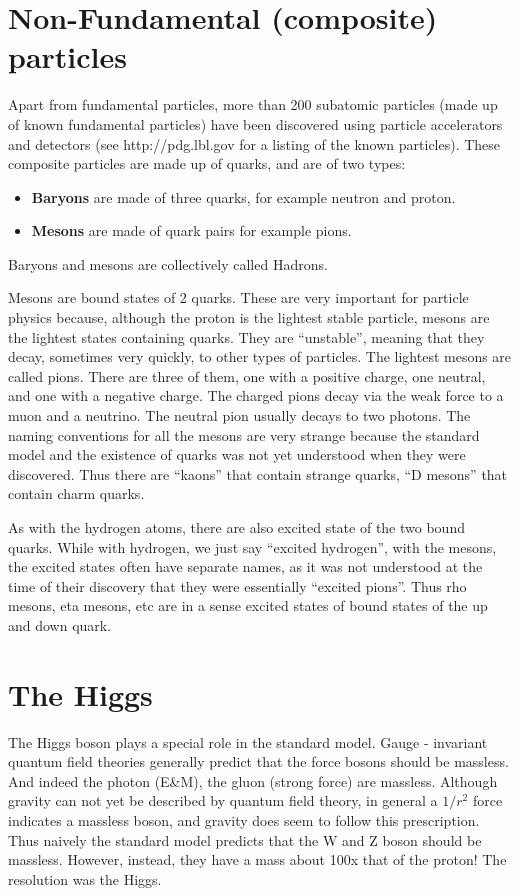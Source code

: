 \section{Non-Fundamental (composite) particles}
Apart from fundamental particles, more than 200 subatomic particles (made up of known fundamental particles) have been discovered using particle accelerators and detectors (see http://pdg.lbl.gov for a listing of the known particles).  These composite particles are made up of quarks, and are of two types:
\begin{itemize}
\item {\bf Baryons} are made of three quarks, for example neutron and proton.
\item {\bf Mesons} are made of quark pairs for example pions.
\end{itemize}
Baryons and mesons are collectively called Hadrons.




Mesons are bound states of 2 quarks.  These are very important for particle physics because, although the proton is the lightest stable particle, mesons are the lightest states containing quarks.  They are “unstable”, meaning that they decay, sometimes very quickly, to other types of particles.
The lightest mesons are called pions.  There are three of them, one with a positive charge, one neutral, and one with a negative charge.  The charged pions decay via the weak force to a muon and a neutrino.  The neutral pion usually decays to two photons.
The naming conventions for all the mesons are very strange because the standard model and the existence of quarks was not yet understood when they were discovered.  Thus there are “kaons” that contain strange quarks, “D mesons” that contain charm quarks.

As with the hydrogen atoms, there are also excited state of the two bound quarks.  While with hydrogen, we just say “excited hydrogen”, with the mesons, the excited states often have separate names, as it was not understood at the time of their discovery that they were essentially “excited pions”.  Thus rho mesons, eta mesons, etc are in a sense excited states of bound states of the up and down quark.

\section{The Higgs}
The  Higgs  boson  plays  a  special  role  in  the  standard  model.    Gauge
-
invariant  quantum  field  theories 
generally 
predict  that  the  force  bosons  should  be  massless.    And  indeed  the  photon  (E\&M),  the  gluon 
(strong force) are massless.  Although gravity can not yet be described by quantum field theory, in general a 
$1/r^2$ force indicates a massless boson, and gravity does
seem to follow this prescription.   Thus naively the 
standard model predicts that the W and Z boson should be massless.  However, instead, they have a mass 
about 100x that of the proton!  
The resolution was the Higgs.

